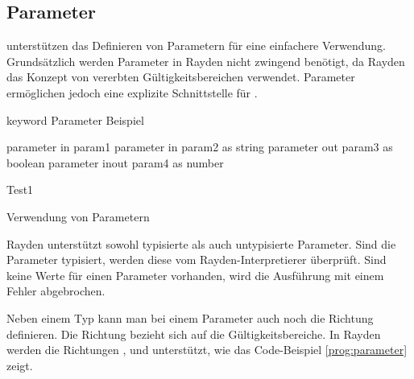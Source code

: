 
\subsection{Parameter}
\label{cha:Parameter}

 unterstützen das Definieren von Parametern für eine einfachere Verwendung. Grundsätzlich werden Parameter in Rayden nicht zwingend benötigt, da Rayden das Konzept von vererbten Gültigkeitsbereichen verwendet. Parameter ermöglichen jedoch eine explizite Schnittstelle für . 

\begin{program}
\begin{JavaCode}
keyword Parameter Beispiel {
	
	parameter in    param1
	parameter in    param2 as string
	parameter out   param3 as boolean
	parameter inout param4 as number
	
	Test1	
}
\end{JavaCode}
\caption{Verwendung von Parametern}
\label{prog:parameter}
\end{program}


\SuperPar
Rayden unterstützt sowohl typisierte als auch untypisierte Parameter. Sind die Parameter typisiert, werden diese vom Rayden-Interpretierer überprüft. Sind keine Werte für einen Parameter vorhanden, wird die Ausführung mit einem Fehler abgebrochen. 

\SuperPar
Neben einem Typ kann man bei einem Parameter auch noch die Richtung definieren. Die Richtung bezieht sich auf die Gültigkeitsbereiche. In Rayden werden die Richtungen ,  und  unterstützt, wie das Code-Beispiel \ref{prog:parameter} zeigt. \\

